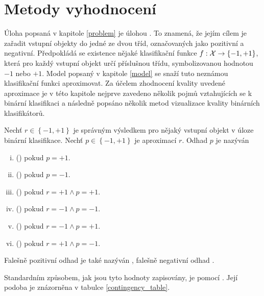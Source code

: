 \chapter{Metody vyhodnocení}\label{evaluation}

Úloha popsaná v kapitole \ref{problem} je úlohou . To znamená, že jejím cílem je zařadit vstupní objekty do jedné ze dvou tříd, označovaných jako pozitivní a negativní. Předpokládá se existence nějaké klasifikační funkce \( f : \mathcal X \to \left\{ -1, +1 \right\} \), která pro každý vstupní objekt určí příslušnou třídu, symbolizovanou hodnotou \( -1 \) nebo \( +1 \). Model popsaný v kapitole \ref{model} se snaží tuto neznámou klasifikační funkci aproximovat. Za účelem zhodnocení kvality uvedené aproximace je v této kapitole nejprve zavedeno několik pojmů vztahujících se k binární klasifikaci a následně popsáno několik metod vizualizace kvality binárních klasifikátorů.

\begin{define}
	Nechť \( r \in \left\{ -1, +1 \right\} \) je správným výsledkem pro nějaký vstupní objekt v úloze binární klasifikace. Nechť \( p \in \left\{ -1, +1 \right\} \) je aproximací \( r \). Odhad \( p \) je nazýván
	\begin{enumerate}[i.]
		\item {} () pokud \( p = +1 \).
		\item {} () pokud \( p = -1 \).
		\item {} () pokud \( r = +1 \land p = +1 \).
		\item {} () pokud \( r = -1 \land p = -1 \).
		\item {} () pokud \( r = -1 \land p = +1 \).
		\item {} () pokud \( r = +1 \land p = -1 \).
	\end{enumerate}
	Falešně pozitivní odhad je také nazýván , falešně negativní odhad .
\end{define}

Standardním způsobem, jak jsou tyto hodnoty zapisovány, je pomocí . Její podoba je znázorněna v tabulce \ref{contingency_table}.

